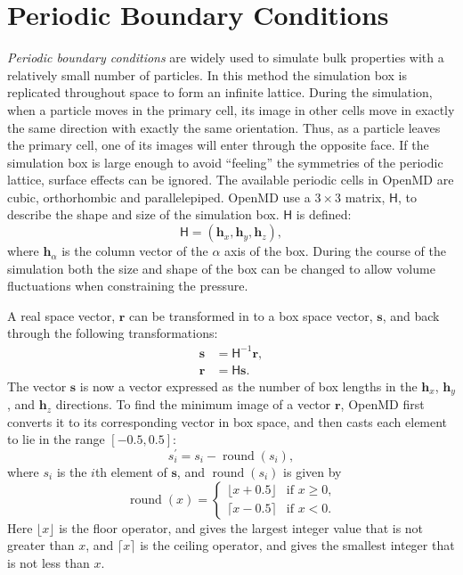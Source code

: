 \documentclass[]{book}
\begin{document}
\section{\label{section:pbc}Periodic Boundary Conditions} 

\newcommand{\roundme}{\operatorname{round}}

\textit{Periodic boundary conditions} are widely used to simulate bulk
properties with a relatively small number of particles. In this method
the simulation box is replicated throughout space to form an infinite
lattice.  During the simulation, when a particle moves in the primary
cell, its image in other cells move in exactly the same direction with
exactly the same orientation. Thus, as a particle leaves the primary
cell, one of its images will enter through the opposite face. If the
simulation box is large enough to avoid ``feeling'' the symmetries of
the periodic lattice, surface effects can be ignored. The available
periodic cells in {\sc OpenMD} are cubic, orthorhombic and
parallelepiped.  {\sc OpenMD} use a $3 \times 3$ matrix, $\mathsf{H}$,
to describe the shape and size of the simulation box. $\mathsf{H}$ is
defined:
\begin{equation}
\mathsf{H} = ( \mathbf{h}_x, \mathbf{h}_y, \mathbf{h}_z ),
\end{equation}
where $\mathbf{h}_{\alpha}$ is the column vector of the $\alpha$ axis of the
box.  During the course of the simulation both the size and shape of
the box can be changed to allow volume fluctuations when constraining
the pressure.

A real space vector, $\mathbf{r}$ can be transformed in to a box space
vector, $\mathbf{s}$, and back through the following transformations:
\begin{align}
\mathbf{s} &= \mathsf{H}^{-1} \mathbf{r}, \\
\mathbf{r} &= \mathsf{H} \mathbf{s}.
\end{align}
The vector $\mathbf{s}$ is now a vector expressed as the number of box
lengths in the $\mathbf{h}_x$, $\mathbf{h}_y$, and $\mathbf{h}_z$
directions. To find the minimum image of a vector $\mathbf{r}$, {\sc
OpenMD} first converts it to its corresponding vector in box space, and
then casts each element to lie in the range $[-0.5,0.5]$:
\begin{equation}
s_{i}^{\prime}=s_{i}-\roundme(s_{i}),
\end{equation}
where $s_i$ is the $i$th element of $\mathbf{s}$, and
$\roundme(s_i)$ is given by
\begin{equation}
\roundme(x) =
	\begin{cases}
	\lfloor x+0.5 \rfloor & \text{if $x \ge 0$,} \\
	\lceil x-0.5 \rceil & \text{if $x < 0$.}
	\end{cases}
\end{equation}
Here $\lfloor x \rfloor$ is the floor operator, and gives the largest
integer value that is not greater than $x$, and $\lceil x \rceil$ is
the ceiling operator, and gives the smallest integer that is not less
than $x$. 
\end{document}
